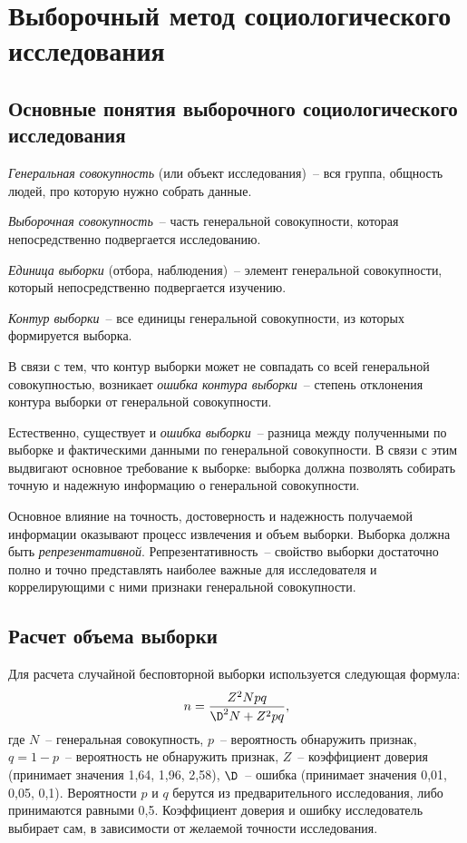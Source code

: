 \chapter{Выборочный метод социологического исследования}
\section{Основные понятия выборочного социологического исследования}

  \emph{Генеральная совокупность} (или объект исследования)~-- вся группа, общность
  людей, про которую нужно собрать данные.
  
  \emph{Выборочная совокупность}~-- часть генеральной совокупности, которая
  непосредственно подвергается исследованию.
  
  \emph{Единица выборки} (отбора, наблюдения)~-- элемент генеральной
  совокупности, который непосредственно подвергается изучению.
  
  \emph{Контур выборки}~-- все единицы генеральной совокупности, из которых
  формируется выборка.
  
  В связи с тем, что контур выборки может не совпадать со всей генеральной
  совокупностью, возникает \emph{ошибка контура выборки}~-- степень отклонения
  контура выборки от генеральной совокупности.
  
  Естественно, существует и \emph{ошибка выборки}~-- разница между полученными
  по выборке и фактическими данными по генеральной совокупности. В связи с этим
  выдвигают основное требование к выборке: выборка должна позволять собирать
  точную и надежную информацию о генеральной совокупности.
  
  Основное влияние на точность, достоверность и надежность получаемой информации
  оказывают процесс извлечения и объем выборки. Выборка должна быть
  \emph{репрезентативной}. Репрезентативность~-- свойство выборки достаточно
  полно и точно представлять наиболее важные для исследователя и коррелирующими
  с ними признаки генеральной совокупности.

\section{Расчет объема выборки}

  Для расчета случайной бесповторной выборки используется следующая формула:
  \[
    n = \frac{Z^2 Npq}{\D^2 N + Z^2 pq},
  \]
  где \( N \)~-- генеральная совокупность, \( p \)~-- вероятность обнаружить
  признак, \( q = 1 - p \)~-- вероятность не обнаружить признак, \( Z \)~--
  коэффициент доверия (принимает значения 1,64, 1,96, 2,58), \( \D \)~-- ошибка
  (принимает значения 0,01, 0,05, 0,1). Вероятности \( p \) и \( q \) берутся из
  предварительного исследования, либо принимаются равными 0,5. Коэффициент
  доверия и ошибку исследователь выбирает сам, в зависимости от желаемой
  точности исследования.
  
